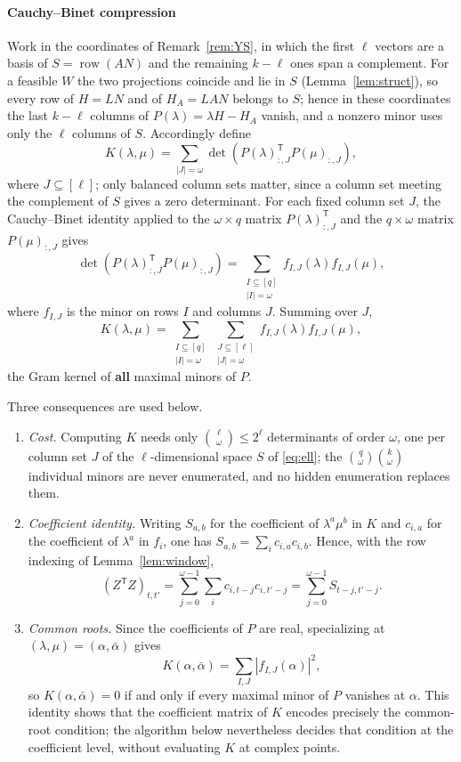 \documentclass[journal]{IEEEtran}
\theoremstyle{plainn}
\theoremstyle{remark}
\begin{document}
\paragraph*{Cauchy--Binet compression}\label{sec:cb}
Work in the coordinates of Remark~\ref{rem:YS}, in which the first $\ell$ vectors are a basis of
$S=\operatorname{row}(AN)$ and the remaining $k-\ell$ ones span a complement. For a feasible $W$ the
two projections coincide and lie in $S$ (Lemma~\ref{lem:struct}), so every row of $H=LN$ and of
$H_A=LAN$ belongs to $S$; hence in these coordinates the last $k-\ell$ columns of $P(\lambda)=\lambda
H-H_A$ vanish, and a nonzero minor uses only the $\ell$ columns of $S$. Accordingly define
\[
K(\lambda,\mu)=\sum_{|J|=\omega}
\det\left(P(\lambda)_{:,J}^{\mathsf T}P(\mu)_{:,J}\right),
\]
where $J\subseteq[\ell]$; only balanced column sets matter, since a column set meeting the
complement of $S$ gives a zero determinant. For each fixed column set $J$, the Cauchy--Binet identity
\cite[Ch.~0]{hj13} applied
to the $\omega\times q$ matrix $P(\lambda)_{:,J}^{\mathsf T}$ and the
$q\times\omega$ matrix $P(\mu)_{:,J}$ gives
\[
\det\!\left(P(\lambda)_{:,J}^{\mathsf T}P(\mu)_{:,J}\right)
=\sum_{\substack{I\subseteq[q]\\ |I|=\omega}}
f_{I,J}(\lambda)f_{I,J}(\mu),
\]
where $f_{I,J}$ is the minor on rows $I$ and columns $J$. Summing over $J$,
\[
K(\lambda,\mu)=\sum_{\substack{I\subseteq[q]\\ |I|=\omega}}
\sum_{\substack{J\subseteq[\ell]\\ |J|=\omega}}
f_{I,J}(\lambda)f_{I,J}(\mu),
\]
the Gram kernel of \textbf{all} maximal minors of $P$.

Three consequences are used below.
\begin{enumerate}[label=(\roman*)]
	\item\label{item:cost} \emph{Cost.} Computing $K$ needs only
	$\binom{\ell}{\omega}\le2^{\ell}$ determinants of order $\omega$, one per
	column set $J$ of the $\ell$-dimensional space $S$ of \eqref{eq:ell}; the
	$\binom q\omega\binom k\omega$ individual minors are never enumerated,
	and no hidden enumeration replaces them.
	\item\label{item:coef} \emph{Coefficient identity.} Writing $S_{a,b}$
	for the coefficient of $\lambda^a\mu^b$ in $K$ and $c_{i,a}$ for the
	coefficient of $\lambda^a$ in $f_i$, one has
	$S_{a,b}=\sum_i c_{i,a}c_{i,b}$. Hence, with the row indexing of
	Lemma~\ref{lem:window},
	\[
	(Z^{\mathsf T}Z)_{t,t'}
	=\sum_{j=0}^{\omega-1}\sum_i c_{i,t-j}c_{i,t'-j}
	=\sum_{j=0}^{\omega-1}S_{t-j,t'-j}.
	\]
	\item\label{item:roots} \emph{Common roots.} Since the coefficients of
	$P$ are real, specializing at $(\lambda,\mu)=(\alpha,\bar\alpha)$ gives
	\[
	K(\alpha,\bar\alpha)
	=\sum_{I,J}\left|f_{I,J}(\alpha)\right|^2,
	\]
	so $K(\alpha,\bar\alpha)=0$ if and only if every maximal minor of $P$
	vanishes at $\alpha$. This identity shows that the coefficient matrix of
	$K$ encodes precisely the common-root condition; the algorithm below
	nevertheless decides that condition at the coefficient level, without
	evaluating $K$ at complex points.
\end{enumerate}
\end{document}

